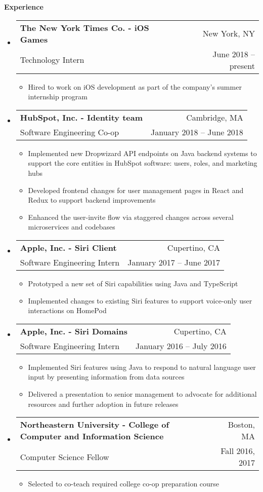 \documentclass[letterpaper,10pt]{article}
\makeatletter
\newcommand{\resitem}[1]{\item #1 \vspace{-2pt}}
\newcommand{\resheading}[1]{{\large \colorbox{mygrey}{\begin{minipage}{\textwidth}{\textbf{#1 \vphantom{p\^{E}}}}\end{minipage}}}}
\newcommand{\ressubheading}[4]{
\begin{tabular*}{6.8in}{l@{\extracolsep{\fill}}r}
		\textbf{#1} & #2 \\
		\small{#3} & \small{#4} \\
\end{tabular*}\vspace{-6pt}}
\makeatother
\begin{document}
\resheading{Experience}
\begin{itemize}[leftmargin=*]
  \item[]
  \ressubheading{The New York Times Co. - \small{iOS Games}}{New York, NY}{Technology Intern}{June 2018 -- present}
  {\footnotesize
    \begin{itemize}
      \resitem{Hired to work on iOS development as part of the company's summer internship program}
  \end{itemize}}
  \item[]
  \ressubheading{HubSpot, Inc. - \small{Identity team}}{Cambridge, MA}{Software Engineering Co-op}{January 2018 -- June 2018}
  {\footnotesize
    \begin{itemize}
      \resitem{Implemented new Dropwizard API endpoints on Java backend systems to support the core entities in HubSpot software: users, roles, and marketing hubs}
      \resitem{Developed frontend changes for user management pages in React and Redux to support backend improvements}
      \resitem{Enhanced the user-invite flow via staggered changes across several microservices and codebases}
  \end{itemize}}
	\item[]
	\ressubheading{Apple, Inc. - \small{Siri Client}}{Cupertino, CA}{Software Engineering Intern}{January 2017 -- June 2017}
	{\footnotesize
		\begin{itemize}
			\resitem{Prototyped a new set of Siri capabilities using Java and TypeScript}
			\resitem{Implemented changes to existing Siri features to support voice-only user interactions on HomePod}
	\end{itemize}}
	\item[]
	\ressubheading{Apple, Inc. - \small{Siri Domains}}{Cupertino, CA}{Software Engineering Intern}{January 2016 -- July 2016}
	{\footnotesize
		\begin{itemize}
			\resitem{Implemented Siri features using Java to respond to natural language user input by presenting information from data sources}
			\resitem{Delivered a presentation to senior management to advocate for additional resources and further adoption in future releases}
	\end{itemize}}
	\item[]
	\ressubheading{Northeastern University - \small{College of Computer and Information Science}}{Boston, MA}{Computer Science Fellow}{Fall 2016, 2017}
	{\footnotesize
		\begin{itemize}
			\resitem{Selected to co-teach required college co-op preparation course}

\end{itemize}}
\end{itemize}
\end{document}
